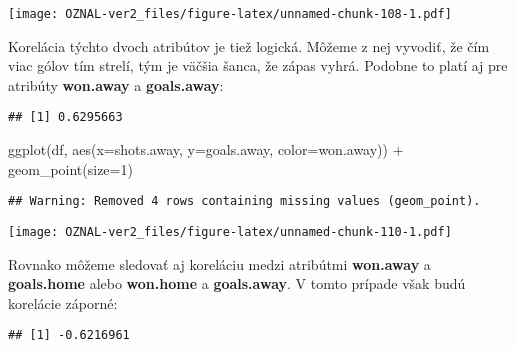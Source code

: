 \documentclass[
]{article}
\newenvironment{Shaded}{\begin{snugshade}}{\end{snugshade}}
\newcommand{\AttributeTok}[1]{\textcolor[rgb]{0.77,0.63,0.00}{#1}}
\newcommand{\DecValTok}[1]{\textcolor[rgb]{0.00,0.00,0.81}{#1}}
\newcommand{\FunctionTok}[1]{\textcolor[rgb]{0.00,0.00,0.00}{#1}}
\newcommand{\NormalTok}[1]{#1}
\newcommand{\SpecialCharTok}[1]{\textcolor[rgb]{0.00,0.00,0.00}{#1}}
\begin{document}
\texttt{[image: OZNAL-ver2\_files/figure-latex/unnamed-chunk-108-1.pdf]}

Korelácia týchto dvoch atribútov je tiež logická. Môžeme z nej vyvodiť,
že čím viac gólov tím strelí, tým je väčšia šanca, že zápas vyhrá.
Podobne to platí aj pre atribúty \textbf{won.away} a
\textbf{goals.away}:

\begin{Shaded}
\end{Shaded}

\begin{verbatim}
## [1] 0.6295663
\end{verbatim}

\begin{Shaded}
\begin{Highlighting}[]
\FunctionTok{ggplot}\NormalTok{(df, }\FunctionTok{aes}\NormalTok{(}\AttributeTok{x=}\NormalTok{shots.away, }\AttributeTok{y=}\NormalTok{goals.away, }\AttributeTok{color=}\NormalTok{won.away)) }\SpecialCharTok{+} \FunctionTok{geom\_point}\NormalTok{(}\AttributeTok{size=}\DecValTok{1}\NormalTok{)}
\end{Highlighting}
\end{Shaded}

\begin{verbatim}
## Warning: Removed 4 rows containing missing values (geom_point).
\end{verbatim}

\texttt{[image: OZNAL-ver2\_files/figure-latex/unnamed-chunk-110-1.pdf]}

Rovnako môžeme sledovať aj koreláciu medzi atribútmi \textbf{won.away} a
\textbf{goals.home} alebo \textbf{won.home} a \textbf{goals.away}. V
tomto prípade však budú korelácie záporné:

\begin{Shaded}
\end{Shaded}

\begin{verbatim}
## [1] -0.6216961
\end{verbatim}
\end{document}
